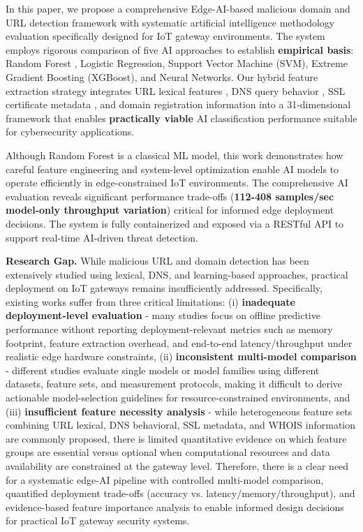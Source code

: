 \documentclass[conference]{IEEEtran}
\begin{document}
In this paper, we propose a comprehensive Edge-AI-based malicious domain and URL detection framework with systematic artificial intelligence methodology evaluation specifically designed for IoT gateway environments. The system employs rigorous comparison of five AI approaches to establish \textbf{empirical basis}: Random Forest \cite{ref_dns_detection}, Logistic Regression, Support Vector Machine (SVM), Extreme Gradient Boosting (XGBoost), and Neural Networks. Our hybrid feature extraction strategy integrates URL lexical features \cite{ref_lexical_features}, DNS query behavior \cite{ref_dga}, SSL certificate metadata \cite{ref_ssl_features}, and domain registration information into a 31-dimensional framework that enables \textbf{practically viable} AI classification performance suitable for cybersecurity applications.

Although Random Forest is a classical ML model, this work demonstrates how careful feature engineering and system-level optimization enable AI models to operate efficiently in edge-constrained IoT environments. The comprehensive AI evaluation reveals significant performance trade-offs (\textbf{112-408 samples/sec model-only throughput variation}) critical for informed edge deployment decisions. The system is fully containerized and exposed via a RESTful API to support real-time AI-driven threat detection.

\textbf{Research Gap.} While malicious URL and domain detection has been extensively studied using lexical, DNS, and learning-based approaches, practical deployment on IoT gateways remains insufficiently addressed. Specifically, existing works suffer from three critical limitations: (i) \textbf{inadequate deployment-level evaluation} - many studies focus on offline predictive performance without reporting deployment-relevant metrics such as memory footprint, feature extraction overhead, and end-to-end latency/throughput under realistic edge hardware constraints, (ii) \textbf{inconsistent multi-model comparison} - different studies evaluate single models or model families using different datasets, feature sets, and measurement protocols, making it difficult to derive actionable model-selection guidelines for resource-constrained environments, and (iii) \textbf{insufficient feature necessity analysis} - while heterogeneous feature sets combining URL lexical, DNS behavioral, SSL metadata, and WHOIS information are commonly proposed, there is limited quantitative evidence on which feature groups are essential versus optional when computational resources and data availability are constrained at the gateway level. Therefore, there is a clear need for a systematic edge-AI pipeline with controlled multi-model comparison, quantified deployment trade-offs (accuracy vs. latency/memory/throughput), and evidence-based feature importance analysis to enable informed design decisions for practical IoT gateway security systems.
\end{document}
